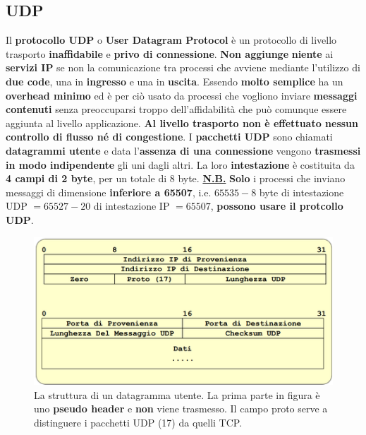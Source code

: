 \documentclass[11pt,a4paper,oneside]{book}
\theoremstyle{definition}
\begin{document}
\subsection{UDP}
Il \textbf{protocollo UDP} o \textbf{User Datagram Protocol} è un protocollo di livello trasporto \textbf{inaffidabile} e \textbf{privo di connessione}. \textbf{Non aggiunge} \textbf{niente} ai \textbf{servizi IP} se non la comunicazione tra processi che avviene mediante l'utilizzo di \textbf{due code}, una in \textbf{ingresso} e una in \textbf{uscita}. Essendo \textbf{molto semplice} ha un \textbf{overhead minimo} ed è per ciò usato da processi che vogliono inviare \textbf{messaggi contenuti} senza preoccuparsi troppo dell'affidabilità che può comunque essere aggiunta al livello applicazione. \textbf{Al livello trasporto non è effettuato nessun controllo di flusso né di congestione}.\newline
I \textbf{pacchetti UDP} sono chiamati \textbf{datagrammi utente} e data l'\textbf{assenza di una connessione} vengono \textbf{trasmessi in modo indipendente} gli uni dagli altri. La loro \textbf{intestazione} è costituita da \textbf{4 campi di 2 byte}, per un totale di 8 byte.
\textbf{\underline{N.B.}} \textbf{Solo} i processi che inviano messaggi di dimensione \textbf{inferiore a 65507}, i.e. $65535 - 8$ byte di intestazione UDP $= 65527 - 20$ di intestazione IP $ = 65507$, \textbf{possono usare il protcollo UDP}.
\begin{figure}[!h]
	\includegraphics[scale=0.5]{Immagini/UDP.png}
	\centering
	\caption{La struttura di un datagramma utente. La prima parte in figura è uno \textbf{pseudo header} e \textbf{non} viene trasmesso. Il campo proto serve a distinguere i pacchetti UDP (17) da quelli TCP.}
\end{figure}\newline
\end{document}
